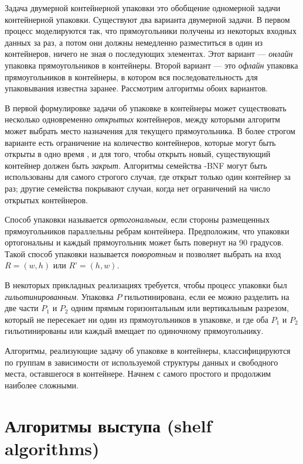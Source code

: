 \documentclass[a4paper,12pt]{report}
\theoremstyle{remark}
\begin{document}
Задача двумерной контейнерной упаковки это обобщение одномерной задачи контейнерной упаковки. Существуют два варианта двумерной задачи. В первом процесс моделируются так, что прямоугольники получены из некоторых входных данных за раз, а потом они должны немедленно разместиться в один из контейнеров, ничего не зная о последующих элементах. Этот вариант — \textit{онлайн} упаковка прямоугольников в контейнеры. Второй вариант — это \textit{офлайн} упаковка прямоугольников в контейнеры, в котором вся последовательность для упаковывания известна заранее. Рассмотрим алгоритмы обоих вариантов.

В первой формулировке задачи об упаковке в контейнеры может существовать несколько одновременно \textit{открытых} контейнеров, между которыми  алгоритм может выбрать место назначения для текущего прямоугольника. В более строгом варианте есть ограничение на количество контейнеров, которые могут быть открыты в одно время , и для того, чтобы открыть новый, существующий контейнер должен быть \textit{закрыт}. Алгоритмы семейства -BNF могут быть использованы для самого строгого случая, где открыт только один контейнер за раз; другие семейства покрывают случаи, когда нет ограничений на число открытых контейнеров.

Способ упаковки называется \textit{ортогональным}, если стороны размещенных прямоугольников параллельны ребрам контейнера. Предположим, что упаковки ортогональны и каждый прямоугольник может быть повернут на 90 градусов. Такой способ упаковки называется \textit{поворотным} и позволяет выбрать на вход $R = (w, h)$ или $R’ = (h, w)$.

В некоторых прикладных реализациях требуется, чтобы процесс упаковки был \textit{гильотинированным}. Упаковка $P$ гильотинирована, если ее можно разделить на две части $P_1$ и $P_2$ одним прямым горизонтальным или вертикальным разрезом, который не пересекает ни один из прямоугольников в упаковке, и где оба $P_1$ и $P_2$ гильотинированы или каждый вмещает по одиночному прямоугольнику.

Алгоритмы, реализующие задачу об упаковке в контейнеры, классифицируются по группам в зависимости от используемой структуры данных  и свободного места, оставшегося в контейнере. Начнем с самого простого и продолжим наиболее сложными.

\section{Алгоритмы выступа (shelf algorithms)}
\end{document}
